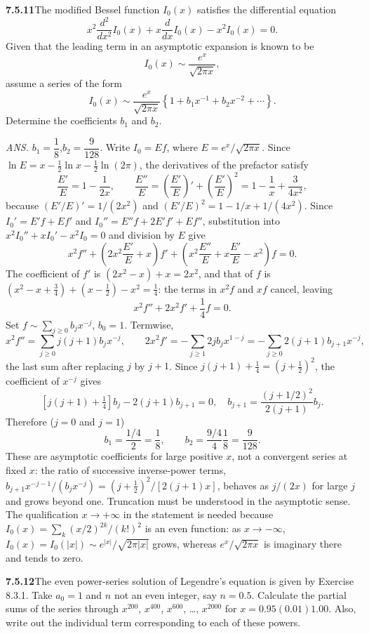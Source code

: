 \par\bigskip
\noindent\textbf{7.5.11}\quad The modified Bessel function $I_{0}(x)$
satisfies the differential equation
\[
x^{2}\frac{d^{2}}{dx^{2}}I_{0}(x)+x\frac{d}{dx}I_{0}(x)-x^{2}I_{0}(x)=0.
\]
Given that the leading term in an asymptotic expansion
 is known to be
\[
I_{0}(x)\sim\frac{e^{x}}{\sqrt{2\pi x}},
\]
assume a series of the form
\[
I_{0}(x)\sim\frac{e^{x}}{\sqrt{2\pi x}}
\left\{1+b_{1}x^{-1}+b_{2}x^{-2}+\cdots\right\}.
\]
Determine the coefficients $b_{1}$ and $b_{2}$.
\par\nobreak\hfill\emph{ANS.}\enspace
$b_{1}=\dfrac{1}{8}$,\quad$b_{2}=\dfrac{9}{128}$.
\solution
Write $I_0=Ef$, where $E=e^x/\sqrt{2\pi x}$. Since
$\ln E=x-\frac12\ln x-\frac12\ln(2\pi)$, the derivatives of the
prefactor satisfy
\[
\frac{E'}E=1-\frac1{2x},\qquad
\frac{E''}E=\left(\frac{E'}E\right)'+\left(\frac{E'}E\right)^2
=1-\frac1x+\frac3{4x^2},
\]
because $(E'/E)'=1/(2x^2)$ and $(E'/E)^2=1-1/x+1/(4x^2)$.
Since $I_0'=E'f+Ef'$ and $I_0''=E''f+2E'f'+Ef''$,
substitution into $x^2I_0''+xI_0'-x^2I_0=0$ and division by $E$ give
\[
x^2f''+\left(2x^2\frac{E'}E+x\right)f'
+\left(x^2\frac{E''}E+x\frac{E'}E-x^2\right)f=0.
\]
The coefficient of $f'$ is $(2x^2-x)+x=2x^2$, and that of $f$ is
$(x^2-x+\frac34)+(x-\frac12)-x^2=\frac14$: the terms in $x^2f$ and
$xf$ cancel, leaving
\[
\boxed{x^2f''+2x^2f'+\frac14f=0}.
\]
Set $f\sim\sum_{j\ge0}b_jx^{-j}$, $b_0=1$. Termwise,
\[
x^2f''=\sum_{j\ge0}j(j+1)b_jx^{-j},\qquad
2x^2f'=-\sum_{j\ge1}2jb_jx^{1-j}=-\sum_{j\ge0}2(j+1)b_{j+1}x^{-j},
\]
the last sum after replacing $j$ by $j+1$. Since
$j(j+1)+\frac14=(j+\frac12)^2$, the coefficient of $x^{-j}$ gives
\[
[j(j+1)+\tfrac14]b_j-2(j+1)b_{j+1}=0,
\quad b_{j+1}=\frac{(j+1/2)^2}{2(j+1)}b_j.
\]
Therefore ($j=0$ and $j=1$)
\[
\boxed{b_1=\frac{1/4}{2}=\frac18},\qquad
\boxed{b_2=\frac{9/4}{4}\frac18=\frac9{128}}.
\]
These are asymptotic coefficients for large positive $x$, not a
convergent series at fixed $x$: the ratio of successive inverse-power
terms, $b_{j+1}x^{-j-1}/(b_jx^{-j})=(j+\frac12)^2/[2(j+1)x]$, behaves as
$j/(2x)$ for large $j$ and grows beyond one. Truncation
must be understood in the asymptotic sense. The qualification
$x\to+\infty$ in the statement is needed because
$I_0(x)=\sum_k(x/2)^{2k}/(k!)^2$ is an even function: as $x\to-\infty$,
$I_0(x)=I_0(|x|)\sim e^{|x|}/\sqrt{2\pi|x|}$ grows, whereas
$e^x/\sqrt{2\pi x}$ is imaginary there and tends to zero.

\par\bigskip
\noindent\textbf{7.5.12}\quad The even power-series solution of Legendre's
equation is given by Exercise 8.3.1. Take $a_{0}=1$ and $n$ not an even
integer, say $n=0.5$. Calculate the partial sums of the series through
$x^{200}$, $x^{400}$, $x^{600}$, \ldots, $x^{2000}$ for $x=0.95(0.01)1.00$.
Also, write out the individual term corresponding to each of these powers.

